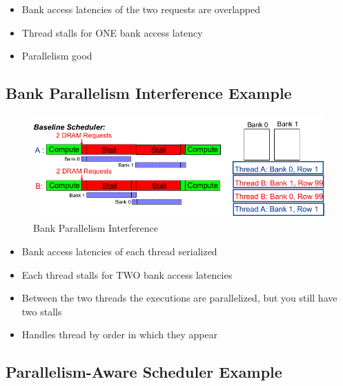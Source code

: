 \documentclass[]{article}
\providecommand{\tightlist}{%
  \setlength{\itemsep}{0pt}\setlength{\parskip}{0pt}}
\begin{document}
\begin{itemize}
\tightlist
\item
  Bank access latencies of the two requests are overlapped
\item
  Thread stalls for ONE bank access latency
\item
  Parallelism good
\end{itemize}

\hypertarget{bank-parallelism-interference-example}{%
\subsection{Bank Parallelism Interference
Example}\label{bank-parallelism-interference-example}}

\begin{figure}
\centering
\includegraphics{./tex2pdf.-ee748c56ff17e1e1/96b8b201dd49a234602d2f78ce076a74c561fa84.png}
\caption{Bank Parallelism Interference}
\end{figure}

\begin{itemize}
\tightlist
\item
  Bank access latencies of each thread serialized
\item
  Each thread stalls for TWO bank access latencies
\item
  Between the two threads the executions are parallelized, but you still
  have two stalls
\item
  Handles thread by order in which they appear
\end{itemize}

\hypertarget{parallelism-aware-scheduler-example}{%
\subsection{Parallelism-Aware Scheduler
Example}\label{parallelism-aware-scheduler-example}}
\end{document}
